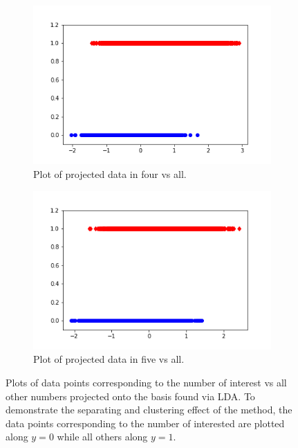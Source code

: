 \documentclass[12pt]{article}%
\numberwithin{equation}{subsection}
\begin{document}
\begin{figure}[H]
    \begin{subfigure}[b]{0.5\linewidth}
        \centering
        \includegraphics[width=\linewidth]{images/fig4.png}
        \caption{Plot of projected data in four vs all.}
        \label{fig2:a}
        \vspace{4ex}
    \end{subfigure}%
    \begin{subfigure}[b]{0.5\linewidth}
        \centering
        \includegraphics[width=\linewidth]{images/fig5.png}
        \caption{Plot of projected data in five vs all.}
        \label{fig2:a}
        \vspace{4ex}
    \end{subfigure}%

        \caption{Plots of data points corresponding to the number of interest vs all other numbers projected onto the basis found via LDA. To demonstrate the separating and clustering effect of the method, the data points corresponding to the number of interested are plotted along $y=0$ while all others along $y=1$.}
    \label{fig2}
\end{figure}
\end{document}
